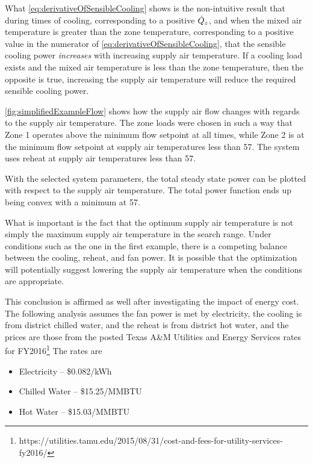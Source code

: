 What  \ref{eq:derivativeOfSensibleCooling} shows is the
non-intuitive result that during times of cooling, corresponding to a
positive \(\dot{Q}_{z}\), and when the mixed air temperature is
greater than the zone temperature, corresponding to a positive value in
the numerator of  \ref{eq:derivativeOfSensibleCooling}, that
the sensible cooling power \textit{increases} with increasing supply air
temperature. If a cooling load exists and the mixed air temperature is
less than the zone temperature, then the opposite is true, increasing
the supply air temperature will reduce the required sensible cooling
power.

\figref{} \ref{fig:simplifiedExampleFlow} shows how the supply air flow
changes with regards to the supply air temperature. The zone loads were
chosen in such a way that Zone 1 operates above the minimum flow
setpoint at all times, while Zone 2 is at the minimum flow setpoint at
supply air temperatures less than \SI{57}{\degreeF}. The system uses
reheat at supply air temperatures less than \SI{57}{\degreeF}. 

With the selected system parameters, the total steady state power can be
plotted with respect to the supply air temperature. The total power
function ends up being convex with a minimum at \SI{57}{\degreeF}. 

What is important is the fact that the optimum supply air temperature is
not simply the maximum supply air temperature in the search range. Under
conditions such as the one in the first example, there is a competing
balance between the cooling, reheat, and fan power. It is possible that
the optimization will potentially suggest lowering the supply air
temperature when the conditions are appropriate.

This conclusion is affirmed as well after investigating the impact of
energy cost. The following analysis assumes the fan power is met by
electricity, the cooling is from district chilled water, and the reheat
is from district hot water, and the prices are those from the posted
Texas A\&M Utilities and Energy Services rates for
FY2016\footnote{https://utilities.tamu.edu/2015/08/31/cost-and-fees-for-utility-services-fy2016/}
The rates are 

\begin{itemize}
    \item Electricity -- \$0.082/kWh
    \item Chilled Water -- \$15.25/MMBTU
    \item Hot Water -- \$15.03/MMBTU
\end{itemize}

